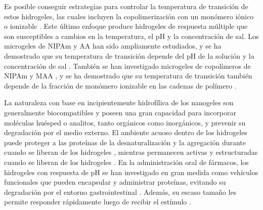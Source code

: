 Es posible conseguir estrategias para controlar la temperatura de transici\'on de estos hidrogeles, las cuales incluyen la copolimerizaci\'on con un mon\'omero i\'onico o ionizable \cite{Cai2007,Macchione2019, Hirose1987,Lopez2020}.
Este \'ultimo enfoque produce hidrogeles de respuesta m\'ultiple que son susceptibles a cambios en la temperatura, el pH y la concentraci\'on de sal.
Los microgeles de NIPAm y AA han sido ampliamente estudiados, y se ha demostrado que su temperatura de transici\'on depende del pH de la soluci\'on y la concentraci\'on de sal \cite{Morris1997, Jones2000,Bradley2005,Begum2016}.
Tambi\'en se han investigado microgeles de copol\'imeros de NIPAm y MAA \cite{Dowding2000,Hoare2004,Giussi2015}, y se ha demostrado que su temperatura de transici\'on tambi\'en depende de la fracci\'on de mon\'omero ionizable en las cadenas de pol\'imero \cite{Morris1997,Jones2000, Hoare2004, Bradley2005, Lee2008,Wong2009,Hamzavi2016}.


La naturaleza con base en incipientemente hidrof\'ilica de los nanogeles son generalmente biocompatibles y poseen una gran capacidad para incorporar mol\'eculas hu\'esped o analitos, tanto org\'anicos como inorg\'anicos, y prevenir su degradaci\'on por el medio externo.
El ambiente acuoso dentro de los hidrogeles puede proteger a las prote\'inas de la desnaturalizaci\'on y la agregaci\'on durante cuando se liberan de los hidrogeles \cite{asayama2008comparison,sawada2010nano,beierle2014polymer}, mientras permanecen activas y estructuradas cuando se liberan de los hidrogeles \cite{vermonden2012hydrogels}.
En la administraci\'on oral de f\'armacos, los hidrogeles con respuesta de pH se han investigado en gran medida como veh\'iculos funcionales que pueden encapsular y administrar prote\'inas, evitando su degradaci\'on por el entorno gastrointestinal \cite{malmsten2008biomacromolecules,renukuntla2013approaches,koetting2014ph}.
Adem\'as, su escaso tama\~no les permite responder r\'apidamente luego de recibir el est\'imulo \cite{tanaka1979kinetics}.



